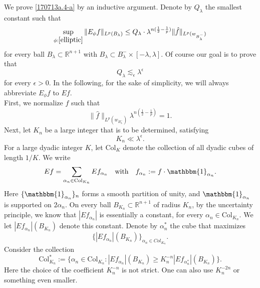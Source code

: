 \documentclass[12pt,leqno]{amsart}
\def\R{\mathbb{R}}
\def\beq{\begin{equation}}
\def\endeq{\end{equation}}
\def\lesim{\lesssim}
\theoremstyle{plain}
\numberwithin{equation}{section}
\begin{document}
We prove \eqref{170713a.4-a} by an inductive argument. Denote by $Q_{\lambda}$ the smallest constant such that 
\[
\sup_{\phi: \eqref{elliptic}}\|E_{\phi} f\|_{L^p(B_{\lambda})} \le Q_{\lambda} \cdot \lambda^{n(\frac{1}{2}-\frac{1}{p})}\|\hat{f}\|_{L^p(w_{B^-_{\lambda}})}
\]
for every ball $B_{\lambda}\subset \R^{n+1}$ with $B_{\lambda}\subset B^-_{\lambda}\times [-\lambda, \lambda]$. Of course our goal is to prove that 
\beq \label{eq:Qind}
Q_{\lambda}\lesim_{\epsilon} \lambda^{\epsilon}
\endeq
for every $\epsilon>0$. In the following, for the sake of simplicity, we will always abbreviate $E_{\phi} f$ to $E f$.\\


First, we normalize $f$ such that 
\beq\label{normalisation}
\|\hat{f}\|_{L^p(w_{B^-_{\lambda}})} \lambda^{n(\frac{1}{2}-\frac{1}{p})} = 1.
\endeq
Next, let $K_n$ be a large integer that is to be determined, satisfying 
\[
K_n\ll \lambda^{\epsilon}.
\]
For a large dyadic integer $K$, let $\mathrm{Col}_K$ denote the collection of all dyadic cubes of length $1/K$. We write 
\[
Ef=\sum_{\alpha_n\in \mathrm{Col}_{K_n}} Ef_{\alpha_n} \quad \text{with} \quad f_{\alpha_n}:=f\cdot \mathbbm{1}_{\alpha_n}.
\]
Here $\{\mathbbm{1}_{\alpha_n}\}_{n}$ forms a smooth partition of unity, and $\mathbbm{1}_{\alpha_n}$ is supported on $2\alpha_n$. On every ball $B_{K_n}\subset \R^{n+1}$ of radius $K_n$, by the uncertainty principle, we know that $|E f_{\alpha_n}|$ is essentially a constant, for every $\alpha_n\in \mathrm{Col}_{K_n}$. We let $|Ef_{\alpha_n}|(B_{K_n})$ denote this constant. Denote by $\alpha_n^*$ the cube that maximizes 
\[
\{|E f_{\alpha_n}|(B_{K_n})\}_{\alpha_n\in Col_{K_n}}.
\] 
Consider the collection 
\[
\mathrm{Col}^*_{K_n}:=\{\alpha_n\in \mathrm{Col}_{K_n}: |Ef_{\alpha_n}|(B_{K_n})\ge K_n^{-n} |Ef_{\alpha^*_n}|(B_{K_n})\}.
\]
Here the choice of the coefficient $K_n^{-n}$ is not strict. One can also use $K_n^{-2n}$ or something even smaller. \\
\end{document}
